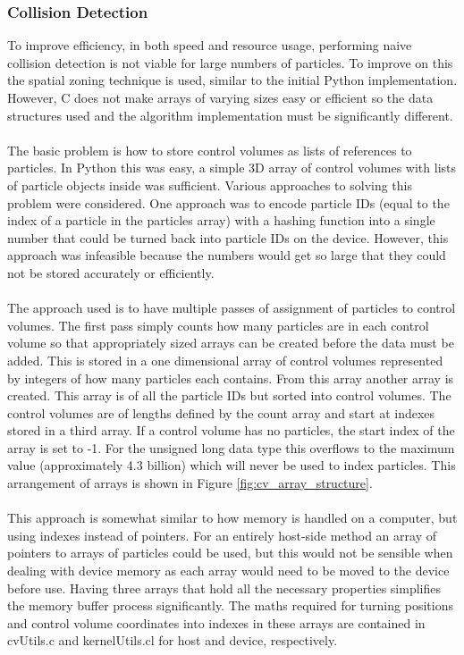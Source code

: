 \documentclass[a4paper,11pt,titlepage]{report}
\begin{document}
\subsubsection{Collision Detection}
\label{sec:OpenCL Collision Detection}
To improve efficiency, in both speed and resource usage, performing naive collision detection is not viable for large numbers of particles. To improve on this the spatial zoning technique is used, similar to the initial Python implementation. However, C does not make arrays of varying sizes easy or efficient so the data structures used and the algorithm implementation must be significantly different.
\\\\The basic problem is how to store control volumes as lists of references to particles. In Python this was easy, a simple 3D array of control volumes with lists of particle objects inside was sufficient. Various approaches to solving this problem were considered. One approach was to encode particle IDs (equal to the index of a particle in the particles array) with a hashing function into a single number that could be turned back into particle IDs on the device. However, this approach was infeasible because the numbers would get so large that they could not be stored accurately or efficiently.
\\\\The approach used is to have multiple passes of assignment of particles to control volumes. The first pass simply counts how many particles are in each control volume so that appropriately sized arrays can be created before the data must be added. This is stored in a one dimensional array of control volumes represented by integers of how many particles each contains. From this array another array is created. This array is of all the particle IDs but sorted into control volumes. The control volumes are of lengths defined by the count array and start at indexes stored in a third array. If a control volume has no particles, the start index of the array is set to -1. For the unsigned long data type this overflows to the maximum value (approximately 4.3 billion) which will never be used to index particles. This arrangement of arrays is shown in Figure \ref{fig:cv_array_structure}.
\\\\This approach is somewhat similar to how memory is handled on a computer, but using indexes instead of pointers. For an entirely host-side method an array of pointers to arrays of particles could be used, but this would not be sensible when dealing with device memory as each array would need to be moved to the device before use. Having three arrays that hold all the necessary properties simplifies the memory buffer process significantly. The maths required for turning positions and control volume coordinates into indexes in these arrays are contained in cvUtils.c and kernelUtils.cl for host and device, respectively.
\end{document}
